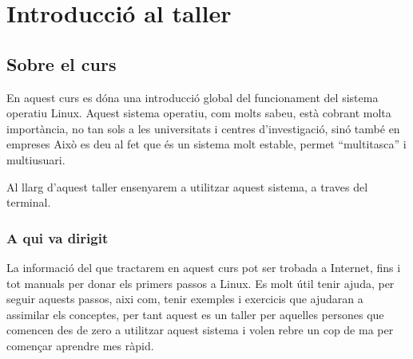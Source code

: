 \section{Introducció al taller}

\subsection{Sobre el curs}

\par
En aquest curs es dóna una introducció global del funcionament del sistema operatiu Linux.
Aquest sistema operatiu, com molts sabeu, està cobrant molta importància, no tan sols a les universitats i centres d'investigació, sinó també en empreses
Això es deu al fet que és un sistema molt estable, permet ``multitasca'' i multiusuari.
\par
Al llarg d'aquest taller ensenyarem a utilitzar aquest sistema, a traves del terminal.

\subsubsection{A qui va dirigit}

\par
La informació del que tractarem en aquest curs pot ser trobada a Internet, fins i tot manuals per donar els primers passos a Linux.
Es molt útil tenir ajuda, per seguir aquests passos, aixi com, tenir exemples i exercicis que ajudaran a assimilar els conceptes, per tant aquest es un taller per aquelles persones que comencen des de zero a utilitzar aquest sistema i volen rebre un cop de ma per començar aprendre mes ràpid.
